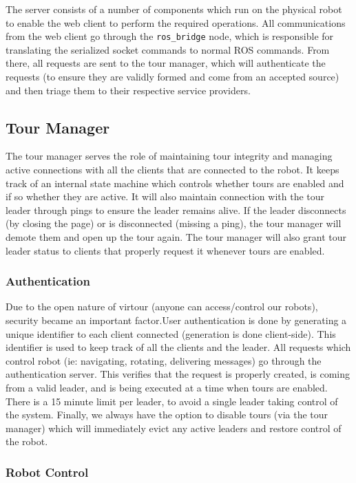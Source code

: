 \documentclass[
  oneside,
  11pt, a4paper,
  footinclude=true,
  headinclude=true,
  cleardoublepage=empty
]{article}
\begin{document}
The server consists of a number of components which run on the physical robot
to enable the web client to perform the required operations. All communications
from the web client go through the \verb|ros_bridge| node, which is responsible
for translating the serialized socket commands to normal ROS commands. From
there, all requests are sent to the tour manager, which will authenticate the
requests (to ensure they are validly formed and come from an accepted source)
and then triage them to their respective service providers.

\subsection{Tour Manager}

The tour manager serves the role of maintaining tour integrity and managing
active connections with all the clients that are connected to the robot. It
keeps track of an internal state machine which controls whether tours are
enabled and if so whether they are active. It will also maintain connection
with the tour leader through pings to ensure the leader remains alive. If the
leader disconnects (by closing the page) or is disconnected (missing a ping),
the tour manager will demote them and open up the tour again. The tour manager
will also grant tour leader status to clients that properly request it whenever
tours are enabled.

\subsubsection{Authentication}

Due to the open nature of virtour (anyone can access/control our robots),
security became an important factor.User authentication is done by generating a
unique identifier to each client connected (generation is done client-side).
This identifier is used to keep track of all the clients and the leader. All
requests which control robot (ie: navigating, rotating, delivering messages) go
through the authentication server. This verifies that the request is properly
created, is coming from a valid leader, and is being executed at a time when
tours are enabled. There is a 15 minute limit per leader, to avoid
a single leader taking control of the system. Finally, we always have the
option to disable tours (via the tour manager) which will immediately evict any
active leaders and restore control of the robot.

\subsubsection{Robot Control}
\end{document}
